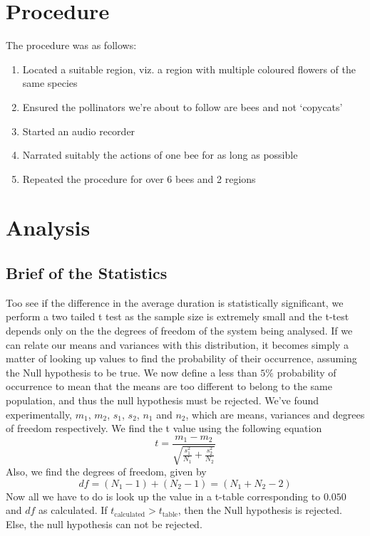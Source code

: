 \section{Procedure}
	The procedure was as follows:
	\begin{enumerate}
		\item Located a suitable region, viz. a region with multiple coloured flowers of the same species
		\item Ensured the pollinators we're about to follow are bees and not `copycats'
		\item Started an audio recorder
		\item Narrated suitably the actions of one bee for as long as possible
		\item Repeated the procedure for over 6 bees and 2 regions
	\end{enumerate}

\section{Analysis}
	\subsection{Brief of the Statistics}
	Too see if the difference in the average duration is statistically significant, we perform a two tailed t test as the sample size is extremely small and the t-test depends only on the the degrees of freedom of the system being analysed. If we can relate our means and variances with this distribution, it becomes simply a matter of looking up values to find the probability of their occurrence, assuming the Null hypothesis to be true. We now define a less than $5\%$ probability of occurrence to mean that the means are too different to belong to the same population, and thus the null hypothesis must be rejected. 
	We've found experimentally, $m_1$, $m_2$, $s_1$, $s_2$, $n_1$ and $n_2$, which are means, variances and degrees of freedom respectively.
	We find the t value using the following equation
	\begin{equation}
		t=\frac{m_1 - m_2}{\sqrt{\frac{s_1^2}{N_1} + \frac{s_2^2}{N_2}}}
	\end{equation}
	Also, we find the degrees of freedom, given by
	\begin{equation}
		df = (N_1 -1) + (N_2 -1) = (N_1 + N_2 -2)
	\end{equation}
	Now all we have to do is look up the value in a t-table corresponding to $0.050$ and $df$ as calculated. If $t_\text{calculated}>t_\text{table}$, then the Null hypothesis is rejected. Else, the null hypothesis can not be rejected.


